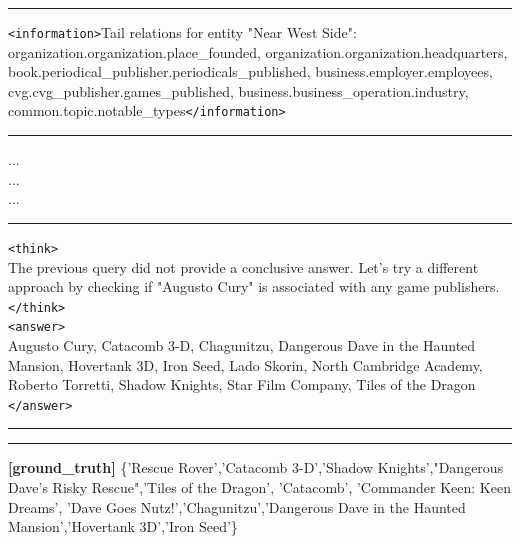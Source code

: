 \begin{table}[H]
\begin{reasonbox}[title=\framework{} Response Example — \dataset{GrailQA}]
\vspace{0.5em}\hrule\vspace{0.5em}

\texttt{<information>}Tail relations for entity "Near West Side": \\
organization.organization.place\_founded, organization.organization.headquarters, book.periodical\_publisher.periodicals\_published, business.employer.employees, cvg.cvg\_publisher.games\_published, business.business\_operation.industry, common.topic.notable\_types\texttt{</information>}

\vspace{0.5em}\hrule\vspace{0.5em}
...\\
...\\
...\\
\vspace{0.5em}\hrule\vspace{0.5em}

\begin{blueblock}
\texttt{<think>} \\
The previous query did not provide a conclusive answer. Let's try a different approach by checking if "Augusto Cury" is associated with any game publishers. \\
\texttt{</think>} \\
\texttt{<answer>} \\
Augusto Cury, Catacomb 3-D, Chagunitzu, Dangerous Dave in the Haunted Mansion, Hovertank 3D, Iron Seed, Lado Skorin, North Cambridge Academy, Roberto Torretti, Shadow Knights, Star Film Company, Tiles of the Dragon \\
\texttt{</answer>}
\end{blueblock}


\vspace{0.5em}\hrule\vspace{0.5em}
\vspace{0.1em}\hrule\vspace{0.5em}

\textbf{[ground\_truth]} \{'Rescue Rover','Catacomb 3-D','Shadow Knights',"Dangerous Dave's Risky Rescue",'Tiles of the Dragon', 'Catacomb', 'Commander Keen: Keen Dreams', 'Dave Goes Nutz!','Chagunitzu','Dangerous Dave in the Haunted Mansion','Hovertank 3D','Iron Seed'\}


\end{reasonbox}
\end{table}




























